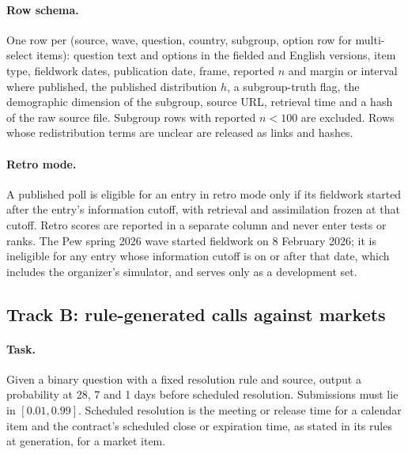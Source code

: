 \documentclass[11pt]{article}
\begin{document}
\paragraph{Row schema.} One row per (source, wave, question, country, subgroup, option row for multi-select items): question text and options in the fielded and English versions, item type, fieldwork dates, publication date, frame, reported $n$ and margin or interval where published, the published distribution $h$, a subgroup-truth flag, the demographic dimension of the subgroup, source URL, retrieval time and a hash of the raw source file. Subgroup rows with reported $n < 100$ are excluded. Rows whose redistribution terms are unclear are released as links and hashes.

\paragraph{Retro mode.} A published poll is eligible for an entry in retro mode only if its fieldwork started after the entry's information cutoff, with retrieval and assimilation frozen at that cutoff. Retro scores are reported in a separate column and never enter tests or ranks. The Pew spring 2026 wave started fieldwork on 8 February 2026; it is ineligible for any entry whose information cutoff is on or after that date, which includes the organizer's simulator, and serves only as a development set.

\subsection{Track B: rule-generated calls against markets}

\paragraph{Task.} Given a binary question with a fixed resolution rule and source, output a probability at 28, 7 and 1 days before scheduled resolution. Submissions must lie in $[0.01, 0.99]$. Scheduled resolution is the meeting or release time for a calendar item and the contract's scheduled close or expiration time, as stated in its rules at generation, for a market item.
\end{document}
